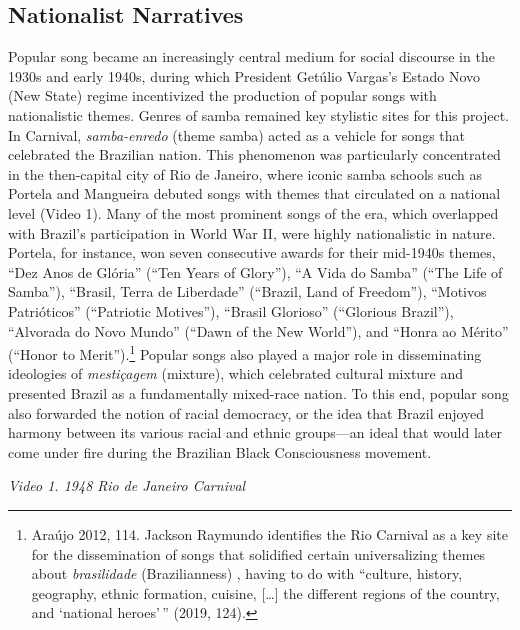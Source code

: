\documentclass[twoside]{article}
\begin{document}
\hypertarget{nationalist-narratives}{%
\subsection*{Nationalist Narratives}\label{nationalist-narratives}}

Popular song became an increasingly central medium for social discourse
in the 1930s and early 1940s, during which President Getúlio Vargas's
Estado Novo (New State) regime incentivized the production of popular
songs with nationalistic themes. Genres of samba remained key stylistic
sites for this project. In Carnival, \emph{samba-enredo} (theme samba)
acted as a vehicle for songs that celebrated the Brazilian nation. This
phenomenon was particularly concentrated in the then-capital city of Rio
de Janeiro, where iconic samba schools such as Portela and Mangueira
debuted songs with themes that circulated on a national level (Video 1).
Many of the most prominent songs of the era, which overlapped with
Brazil's participation in World War II, were highly nationalistic in
nature. Portela, for instance, won seven consecutive awards for their
mid-1940s themes, ``Dez Anos de Glória'' (``Ten Years of Glory''), ``A
Vida do Samba'' (``The Life of Samba''), ``Brasil, Terra de Liberdade''
(``Brazil, Land of Freedom''), ``Motivos Patrióticos'' (``Patriotic
Motives''), ``Brasil Glorioso'' (``Glorious Brazil''), ``Alvorada do
Novo Mundo'' (``Dawn of the New World''), and ``Honra ao Mérito''
(``Honor to Merit'').\footnote{Araújo 2012, 114. Jackson Raymundo
  identifies the Rio Carnival as a key site for the dissemination of
  songs that solidified certain universalizing themes about
  \emph{brasilidade} (Brazilianness) , having to do with ``culture,
  history, geography, ethnic formation, cuisine, {[}\ldots{]} the
  different regions of the country, and `national heroes'\,'' (2019,
  124).} Popular songs also played a major role in disseminating
ideologies of \emph{mestiçagem} (mixture), which celebrated cultural
mixture and presented Brazil as a fundamentally mixed-race nation. To
this end, popular song also forwarded the notion of racial democracy, or
the idea that Brazil enjoyed harmony between its various racial and
ethnic groups---an ideal that would later come under fire during the
Brazilian Black Consciousness movement.

\emph{Video 1. 1948 Rio de Janeiro Carnival}
\end{document}
